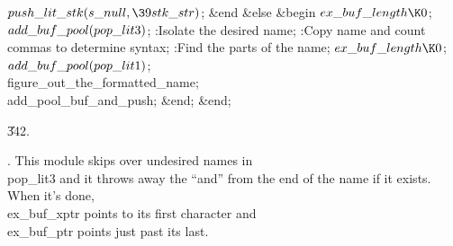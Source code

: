 $\\{push\_lit\_stk}(\\{s\_null},\39\\{stk\_str})$;\6
\&{end}\6
\4\&{else} \&{begin} $\\{ex\_buf\_length}\K0$;\5
$\\{add\_buf\_pool}(\\{pop\_lit3})$;\5
:Isolate the desired name\X;\6
:Copy name and count \\{comma}s to determine syntax\X;\6
:Find the parts of the name\X;\6
$\\{ex\_buf\_length}\K0$;\5
$\\{add\_buf\_pool}(\\{pop\_lit1})$;\5
\\{figure\_out\_the\_formatted\_name};\6
\\{add\_pool\_buf\_and\_push};\6
\&{end};\2\2\2\6
\&{end};\par
\U342.\fi

.
This module skips over undesired names in \\{pop\_lit3} and it throws
away the ``and'' from the end of the name if it exists.  When it's
done, \\{ex\_buf\_xptr} points to its first character and \\{ex\_buf\_ptr}
points just past its last.

